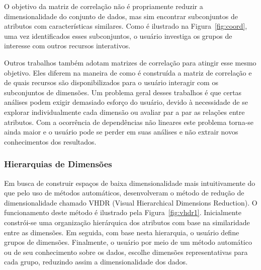 O objetivo da matriz de correlação não é propriamente
reduzir a dimensionalidade do conjunto de dados, mas sim
encontrar subconjuntos de atributos com características
similares. Como é ilustrado na Figura~\ref{fig:coord}, uma
vez identificados esses subconjuntos, o usuário investiga os
grupos de interesse com outros recursos interativos. 

Outros trabalhos
\cite{Friendly2002,MacEachren2003,RBF2004,May2011ss,Johansson2009,Ingram2010,May2011}
também adotam matrizes de correlação para atingir esse mesmo
objetivo. Eles diferem na maneira de como é construída a
matriz de correlação e de quais recursos são
disponibilizados para o usuário interagir com os
subconjuntos de dimensões. Um problema geral desses
trabalhos é que certas análises podem exigir demasiado
esforço do usuário, devido à necessidade de se explorar
individualmente cada dimensão ou avaliar par a par as
relações entre atributos. Com a ocorrência de dependências
não lineares este problema torna-se ainda maior e o usuário
pode se perder em suas análises e não extrair novos
conhecimentos dos resultados. 

\subsubsection{Hierarquias de Dimensões}

Em busca de construir espaços de baixa dimensionalidade mais
intuitivamente do que pelo uso de métodos automáticos,
\cite{Yang2003} desenvolveram o método de redução de
dimensionalidade chamado VHDR (Visual Hierarchical
Dimensions Reduction). O funcionamento deste método é
ilustrado pela Figura~\ref{fig:vhdr1}. Inicialmente
constrói-se uma organização hierárquica dos atributos com
base na similaridade entre as dimensões. Em seguida, com
base nesta hierarquia, o usuário define grupos de dimensões.
Finalmente, o usuário por meio de um método automático ou de
seu conhecimento sobre os dados, escolhe dimensões
representativas para cada grupo, reduzindo assim a
dimensionalidade dos dados. 

